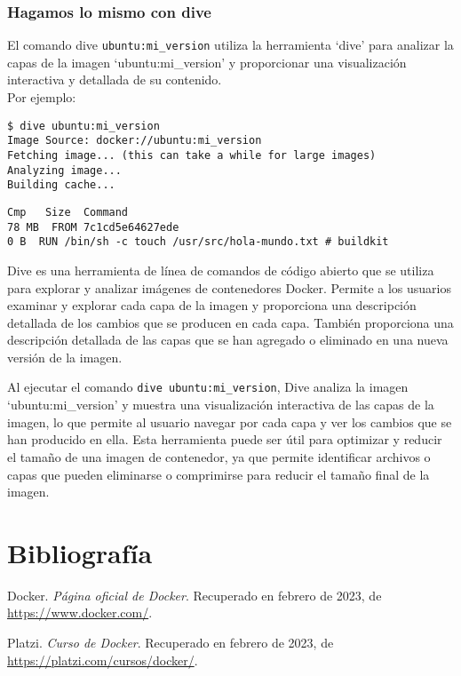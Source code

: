 \documentclass{article}
\begin{document}
\subsubsection{Hagamos lo mismo con dive}
El comando dive \lstinline{ubuntu:mi_version} utiliza la herramienta \enquote*{dive} para analizar la capas de la imagen \enquote*{ubuntu:mi\_version} y proporcionar una visualización interactiva y detallada de su contenido.\\
Por ejemplo:
\begin{lstlisting}[numbers=none]
$ dive ubuntu:mi_version
Image Source: docker://ubuntu:mi_version
Fetching image... (this can take a while for large images)
Analyzing image...
Building cache...      \end{lstlisting}

\begin{lstlisting}[numbers=none]
Cmp   Size  Command                                                          
78 MB  FROM 7c1cd5e64627ede    
0 B  RUN /bin/sh -c touch /usr/src/hola-mundo.txt # buildkit  
\end{lstlisting}
Dive es una herramienta de línea de comandos de código abierto que se utiliza para explorar y analizar imágenes de contenedores Docker. Permite a los usuarios examinar y explorar cada capa de la imagen y proporciona una descripción detallada de los cambios que se producen en cada capa. También proporciona una descripción detallada de las capas que se han agregado o eliminado en una nueva versión de la imagen.

Al ejecutar el comando \lstinline{dive ubuntu:mi_version}, Dive analiza la imagen \enquote*{ubuntu:mi\_version} y muestra una visualización interactiva de las capas de la imagen, lo que permite al usuario navegar por cada capa y ver los cambios que se han producido en ella. Esta herramienta puede ser útil para optimizar y reducir el tamaño de una imagen de contenedor, ya que permite identificar archivos o capas que pueden eliminarse o comprimirse para reducir el tamaño final de la imagen.


\newpage
\section{Bibliografía}
\begin{thebibliography}{9}

      Docker. \textit{Página oficial de Docker}. Recuperado en febrero de 2023, de \url{https://www.docker.com/}.
      
      Platzi. \textit{Curso de Docker}. Recuperado en febrero de 2023, de \url{https://platzi.com/cursos/docker/}.
      
      \end{thebibliography}
\end{document}
